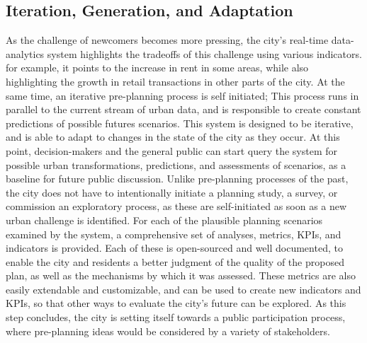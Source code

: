 {{      \subsection{Iteration, Generation, and Adaptation}
      {
          As the challenge of newcomers becomes more pressing, the city's real-time data-analytics system highlights the tradeoffs of this challenge using various indicators. for example, it points to the increase in rent in some areas, while also highlighting the growth in retail transactions in other parts of the city. At the same time, an iterative pre-planning process is self initiated; This process runs in parallel to the current stream of urban data, and is responsible to create constant predictions of possible futures scenarios. This system is designed to be iterative, and is able to adapt to changes in the state of the city as they occur. At this point, decision-makers and the general public can start query the system for possible urban transformations, predictions, and assessments of scenarios, as a baseline for future public discussion. Unlike pre-planning processes of the past, the city does not have to intentionally initiate a planning study, a survey, or commission an exploratory process, as these are self-initiated as soon as a new urban challenge is identified.
          \newline
          For each of the plausible planning scenarios examined by the system, a comprehensive set of analyses, metrics, KPIs, and indicators is provided. Each of these is open-sourced and well documented, to enable the city and residents a better judgment of the quality of the proposed plan, as well as the mechanisms by which it was assessed. These metrics are also easily extendable and customizable, and can be used to create new indicators and KPIs, so that other ways to evaluate the city's future can be explored. As this step concludes, the city is setting itself towards a public participation process, where pre-planning ideas would be considered by a variety of stakeholders.
      }

}}
